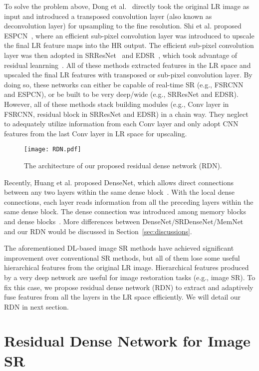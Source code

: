 \documentclass[10pt,twocolumn,letterpaper]{article}
\begin{document}
To solve the problem above, Dong et al.~\cite{dong2016accelerating} directly took the original LR image as input and introduced a transposed convolution layer (also known as deconvolution layer) for upsampling to the fine resolution. Shi et al. proposed ESPCN~\cite{shi2016real}, where an efficient sub-pixel convolution layer was introduced to upscale the final LR feature maps into the HR output. The efficient sub-pixel convolution layer was then adopted in SRResNet~\cite{ledig2017photo} and EDSR~\cite{lim2017enhanced}, which took advantage of residual leanrning~\cite{he2016deep}. All of these methods extracted features in the LR space and upscaled the final LR features with transposed or sub-pixel convolution layer. By doing so, these networks can either be capable of real-time SR (e.g., FSRCNN and ESPCN), or be built to be very deep/wide (e.g., SRResNet and EDSR). However, all of these methods stack building modules (e.g., Conv layer in FSRCNN, residual block in SRResNet and EDSR) in a chain way. They neglect to adequately utilize information from each Conv layer and only adopt CNN features from the last Conv layer in LR space for upscaling.
\begin{figure*}[htbp]
\centering
\texttt{[image: RDN.pdf]}
\caption{The architecture of our proposed residual dense network (RDN).}
\label{fig:RDN} 
\vspace{-4mm}  
\end{figure*}


Recently, Huang et al. proposed DenseNet, which allows direct connections between any two layers within the same dense block~\cite{huang2017densely}. With the local dense connections, each layer reads information from all the preceding layers within the same dense block. The dense connection was introduced among memory blocks~\cite{tai2017memnet} and dense blocks~\cite{tong2017image}. More differences between DenseNet/SRDenseNet/MemNet and our RDN would be discussed in Section~\ref{sec:discussions}.

The aforementioned DL-based image SR methods have achieved significant improvement over conventional SR methods, but all of them lose some useful hierarchical features from the original LR image. Hierarchical features produced by a very deep network are useful for image restoration tasks (e.g., image SR). To fix this case, we propose residual dense network (RDN) to extract and adaptively fuse features from all the layers in the LR space efficiently. We will detail our RDN in next section.


\section{Residual Dense Network for Image SR}
\end{document}
